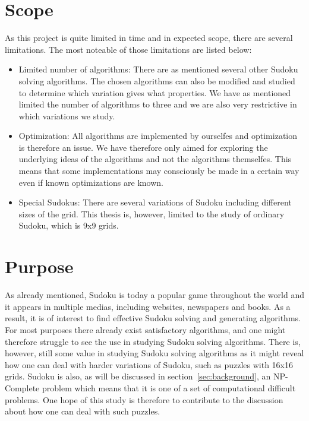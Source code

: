 \documentclass[a4paper,11pt]{kth-mag}
\begin{document}
\FloatBarrier
\section{Scope}
As this project is quite limited in time and in expected scope, 
there are several limitations. The most noteable of those limitations are listed below: 
\begin{itemize}
    \item Limited number of algorithms:
There are as mentioned several other Sudoku solving algorithms. The chosen algorithms can also be modified and studied to determine which variation gives what properties. We have as mentioned limited the number of algorithms to three and we are also very restrictive in which variations we study.  
    \item Optimization: 
All algorithms are implemented by ourselfes and optimization is therefore an issue. 
We have therefore only aimed for exploring the underlying ideas of the algorithms and not the algorithms themselfes.
This means that some implementations may consciously be made in a certain way even if known optimizations are known.

    \item Special Sudokus: There are several variations of Sudoku including different sizes of the grid.
This thesis is, however, limited to the study of ordinary Sudoku, which is 9x9 grids.
\end{itemize}

\FloatBarrier
\section{Purpose}
As already mentioned, Sudoku is today a popular game throughout the world and it appears in multiple medias, including websites, newspapers and books. 
As a result, it is of interest to find effective Sudoku solving and generating algorithms. 
For most purposes there already exist satisfactory algorithms, and one might therefore struggle to see the use in studying Sudoku solving algorithms. 
There is, however, still some value in studying Sudoku solving algorithms as it might reveal how one can deal with harder variations of Sudoku, such as puzzles with 16x16 grids. 
Sudoku is also, as will be discussed in section~\ref{sec:background}, an NP-Complete problem which means that it is one of a set of computational difficult problems.\cite{complexity} 
One hope of this study is therefore to contribute to the discussion about how one can deal with such puzzles. 
\end{document}
